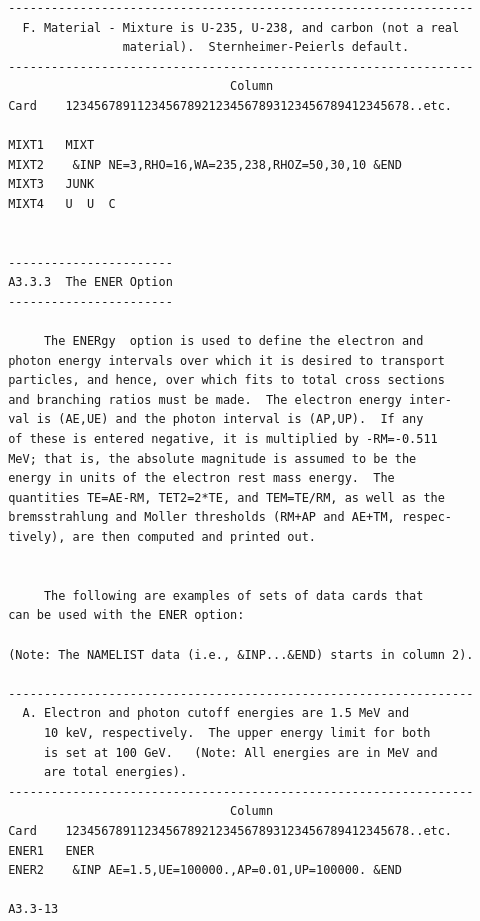 \newpage {}  \begin{verbatim}
 -----------------------------------------------------------------
   F. Material - Mixture is U-235, U-238, and carbon (not a real
                 material).  Sternheimer-Peierls default.
 -----------------------------------------------------------------
                                Column
 Card    123456789112345678921234567893123456789412345678..etc.
 
 MIXT1   MIXT
 MIXT2    &INP NE=3,RHO=16,WA=235,238,RHOZ=50,30,10 &END
 MIXT3   JUNK
 MIXT4   U  U  C
 
 
 -----------------------
 A3.3.3  The ENER Option
 -----------------------
 
      The ENERgy  option is used to define the electron and
 photon energy intervals over which it is desired to transport
 particles, and hence, over which fits to total cross sections
 and branching ratios must be made.  The electron energy inter-
 val is (AE,UE) and the photon interval is (AP,UP).  If any
 of these is entered negative, it is multiplied by -RM=-0.511
 MeV; that is, the absolute magnitude is assumed to be the
 energy in units of the electron rest mass energy.  The
 quantities TE=AE-RM, TET2=2*TE, and TEM=TE/RM, as well as the
 bremsstrahlung and Moller thresholds (RM+AP and AE+TM, respec-
 tively), are then computed and printed out.
 
 
      The following are examples of sets of data cards that
 can be used with the ENER option:
 
 (Note: The NAMELIST data (i.e., &INP...&END) starts in column 2).
 
 -----------------------------------------------------------------
   A. Electron and photon cutoff energies are 1.5 MeV and
      10 keV, respectively.  The upper energy limit for both
      is set at 100 GeV.   (Note: All energies are in MeV and
      are total energies).
 -----------------------------------------------------------------
                                Column
 Card    123456789112345678921234567893123456789412345678..etc.
 ENER1   ENER
 ENER2    &INP AE=1.5,UE=100000.,AP=0.01,UP=100000. &END
 
 A3.3-13
\end{verbatim} 
